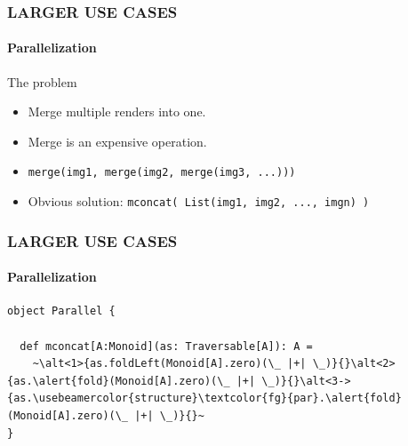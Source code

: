\documentclass{beamer}
\begin{document}
\begin{frame} \frametitle{LARGER USE CASES}
  \framesubtitle{Parallelization}
  \begin{block}{The problem}
    \begin{itemize}
      \item Merge multiple renders into one.
      \item Merge is an expensive operation.
      \item \texttt{merge(img1, merge(img2, merge(img3, ...)))}
      \item Obvious solution: \texttt{mconcat( List(img1, img2, ..., imgn) )}
    \end{itemize}
  \end{block}

  \pause
  
\end{frame}

\begin{frame}[fragile] \frametitle{LARGER USE CASES}
  \framesubtitle{Parallelization}

  \begin{block}{}
  \begin{lstlisting}
object Parallel {

  def mconcat[A:Monoid](as: Traversable[A]): A =
    ~\alt<1>{as.foldLeft(Monoid[A].zero)(\_ |+| \_)}{}\alt<2>{as.\alert{fold}(Monoid[A].zero)(\_ |+| \_)}{}\alt<3->{as.\usebeamercolor{structure}\textcolor{fg}{par}.\alert{fold}(Monoid[A].zero)(\_ |+| \_)}{}~
}
  \end{lstlisting}
  \end{block}

\end{frame}
\end{document}
